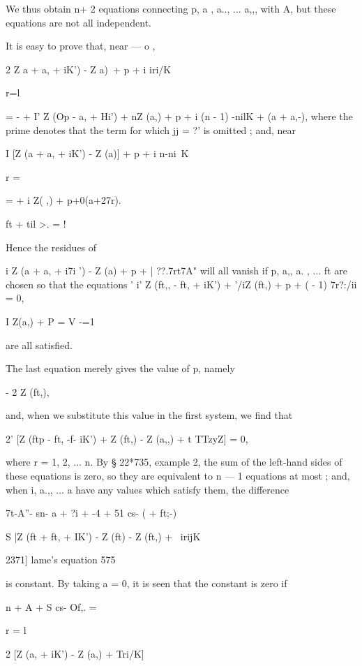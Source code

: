 {{{{{{{{We thus obtain n+ 2 equations connecting p, a , a.., ... a,,, with A, but 
these equations are not all independent. 

It is easy to prove that, near — o , 

2  Z a + a, + iK') - Z  a)\ + p +  i iri/K 

r=l 

= -  + I' Z (Op - a, + Hi') + nZ (a,) + p + i (n - 1) -nilK + (a + a,-), 
where the prime denotes that the term for which jj = ?' is omitted ; and, near 

I [Z (a + a, + iK') - Z (a)] + p + i n-ni\ K 

r = \ 

=  + i Z( ,) + p+0(a+27r). 

ft + til >. = ! 

Hence the residues of 

i  Z (a + a, + i7i ') - Z (a)  + p + | ??.7rt7A" 
will all vanish if p, a,, a. , ... ft  are chosen so that the equations 
' i' Z (ft,, - ft, + iK') + '/iZ (ft,) + p +   (  - 1) 7r?:/ii = 0, 

I Z(a,) + P = 
V -=1 

are all satisfied. 

The last equation merely gives the value of p, namely 

- 2 Z (ft,), 

and, when we substitute this value in the first system, we find that 

2' [Z (ftp - ft, -f- iK') + Z (ft,) - Z (a,,) + t TTzyZ] = 0, 

where r = 1, 2, ... n. By § 22*735, example 2, the sum of the left-hand sides 
of these equations is zero, so they are equivalent to n — 1 equations at most ; 
and, when  i, a.,, ... a  have any values which satisfy them, the difference 



7t-A''- sn- a + ?i + -4 + 51 cs- (  + ft;-) 



S |Z (ft + ft, + IK') - Z (ft) - Z (ft,) + \ irijK\ 



2371] lame's equation 575 

is constant. By taking a = 0, it is seen that the constant is zero if 



n + A + S cs- Of,. = 

r = l 



2 [Z (a, + iK') - Z (a,) +  Tri/K] 

}}}}}}}}
